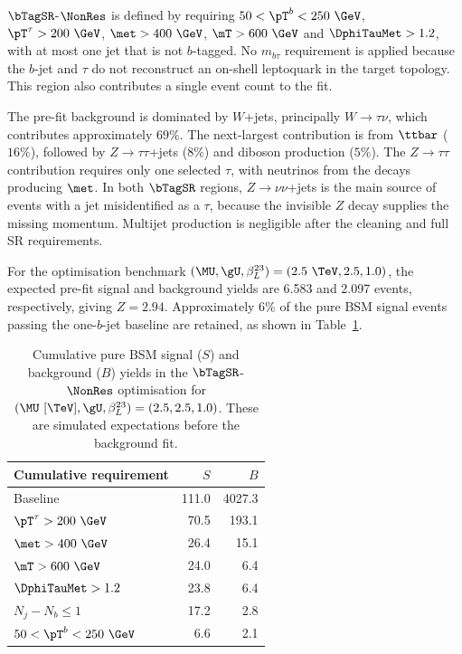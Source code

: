 $\bTagSR$-$\NonRes$ is defined by requiring $50<\pT^b<250~\GeV$, $\pT^\tau>200~\GeV$, $\met>400~\GeV$, $\mT>600~\GeV$ and $\DphiTauMet>1.2$, with at most one jet that is not $b$-tagged.
No $m_{b\tau}$ requirement is applied because the $b$-jet and $\tau$ do not reconstruct an on-shell leptoquark in the target topology.
This region also contributes a single event count to the fit.

The pre-fit background is dominated by $W$+jets, principally $W\to\tau\nu$, which contributes approximately $69\%$.
The next-largest contribution is from $\ttbar$ ($16\%$), followed by $Z\to\tau\tau$+jets ($8\%$) and diboson production ($5\%$).
The $Z\to\tau\tau$ contribution requires only one selected $\tau$, with neutrinos from the decays producing $\met$.
In both $\bTagSR$ regions, $Z\to\nu\nu$+jets is the main source of events with a jet misidentified as a $\tau$, because the invisible $Z$ decay supplies the missing momentum.
Multijet production is negligible after the cleaning and full SR requirements.

For the optimisation benchmark $(\MU,\gU,\beta_L^{23})=(2.5~\TeV,2.5,1.0)$, the expected pre-fit signal and background yields are 6.583 and 2.097 events, respectively, giving $Z=2.94$.
Approximately $6\%$ of the pure BSM signal events passing the one-$b$-jet baseline are retained, as shown in Table~\ref{tab:ch7_cutflow_nonres}.

\begin{table}[htbp]
    \centering
    \small
    \caption{Cumulative pure BSM signal ($S$) and background ($B$) yields in the $\bTagSR$-$\NonRes$ optimisation for $(\MU~[\TeV],\gU,\beta_L^{23})=(2.5,2.5,1.0)$. These are simulated expectations before the background fit.}
    \label{tab:ch7_cutflow_nonres}
    \begin{tabular}{lrr}
        \toprule
        Cumulative requirement & $S$ & $B$ \\
        \midrule
        Baseline & 111.0 & 4027.3 \\
        $\pT^\tau>200~\GeV$ & 70.5 & 193.1 \\
        $\met>400~\GeV$ & 26.4 & 15.1 \\
        $\mT>600~\GeV$ & 24.0 & 6.4 \\
        $\DphiTauMet>1.2$ & 23.8 & 6.4 \\
        $N_j-N_b\leq1$ & 17.2 & 2.8 \\
        $50<\pT^b<250~\GeV$ & 6.6 & 2.1 \\
        \bottomrule
    \end{tabular}
\end{table}

